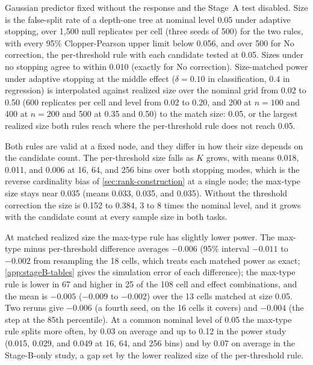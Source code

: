\begin{table}[tb]
{  Gaussian predictor fixed without the response and the Stage~A test disabled.
  Size is the false-split rate of a depth-one tree at nominal level 0.05 under
  adaptive stopping, over 1,500 null replicates per cell (three seeds of 500)
  for the two rules, with every 95\% Clopper-Pearson upper limit below 0.056,
  and over 500 for No correction, the per-threshold rule with each candidate
  tested at 0.05. Sizes under no stopping agree to within 0.010 (exactly for
  No correction). Size-matched power under adaptive stopping at the middle effect ($\delta = 0.10$ in
  classification, $0.4$ in regression) is interpolated against realized size
  over the nominal grid from 0.02 to 0.50 (600 replicates per cell and level
  from 0.02 to 0.20, and 200 at $n=100$ and 400 at $n=200$ and 500 at 0.35 and
  0.50) to the match size: 0.05, or the largest realized size both rules reach
  where the per-threshold rule does not reach 0.05.}
  \label{tab:stageB-only}
\end{table}

Both rules are valid at a fixed node, and they differ in how their size
depends on the candidate count. The per-threshold size falls as $K$ grows, with
means 0.018, 0.011, and 0.006 at 16, 64, and 256 bins over both stopping modes,
which is the reverse cardinality bias of \cref{sec:rank-construction} at a
single node; the max-type size stays near 0.035 (means 0.033, 0.035, and
0.035). Without the threshold correction the size is 0.152 to 0.384, 3 to 8
times the nominal level, and it grows with the candidate count at every sample
size in both tasks.

At matched realized size the max-type rule has slightly lower power. The
max-type minus per-threshold difference averages $-0.006$ (95\% interval
$-0.011$ to $-0.002$ from resampling the 18 cells, which treats each matched
power as exact; \cref{app:stageB-tables} gives the simulation error of each
difference); the max-type rule is lower
in 67 and higher in 25 of the 108 cell and effect combinations, and the mean is
$-0.005$ ($-0.009$ to $-0.002$) over the 13 cells matched at size 0.05. Two reruns give $-0.006$ (a fourth
seed, on the 16 cells it covers) and $-0.004$ (the step at the 85th percentile). At a
common nominal level of 0.05 the max-type rule splits more often, by 0.03 on
average and up to 0.12 in the power study (0.015, 0.029, and 0.049 at 16, 64,
and 256 bins) and by 0.07 on average in the Stage-B-only study, a gap set by
the lower realized size of the per-threshold rule.

